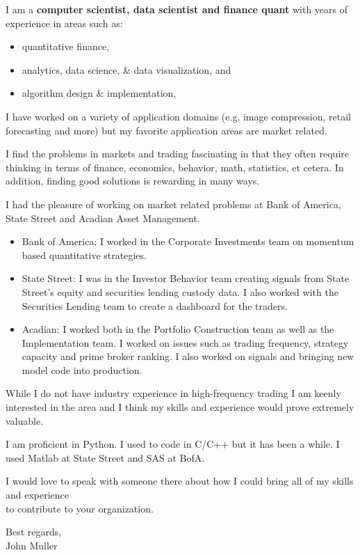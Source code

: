 \documentclass{letter}
\begin{document}
\noindent
I am a \textbf {computer scientist, data scientist and finance quant} with years of experience 
in areas such as:
\vspace{-.1in}
\begin{itemize}[noitemsep]
 \item quantitative finance, 
 \item analytics, data science, \& data visualization, and
 \item algorithm design \& implementation,
\end{itemize}

\noindent I have worked on a variety of application domains 
(e.g. image compression, retail forecasting and more)
but my favorite application areas are market related.

\noindent I find the problems in markets and trading fascinating in that they often require thinking in terms of finance, economics, behavior, math, statistics, et cetera.
In addition, finding good solutions is rewarding in many ways.


\noindent
I had the pleasure of working on market related 
problems at Bank of America, State Street and Acadian Asset Management.
\begin{itemize}
\item Bank of America: I worked in the Corporate Investments team on momentum based quantitative strategies.

\item State Street: I was in the Investor Behavior team 
 creating signals from State Street's equity and securities lending custody data.
 I also worked with the Securities Lending team to create a dashboard for the traders.
 
\item Acadian: I worked both in the Portfolio Construction team as well as the Implementation team. I worked on issues such as trading frequency, strategy capacity and prime broker ranking. I also worked on signals and bringing new model code into production.
 \end{itemize}
 

\noindent
While I do not have industry experience in high-frequency trading I am keenly interested in the area and I think my skills and experience would prove extremely valuable.

\noindent
I am proficient in Python.  I used to code in C/C++ but it has been a while.  I used Matlab at State Street and SAS at BofA.

\noindent
I would love to speak with someone there about how I could bring all of my skills and experience \\
to contribute to your organization.

\vspace*{0.2in}
\noindent Best regards,\\
John Muller
\end{document}
